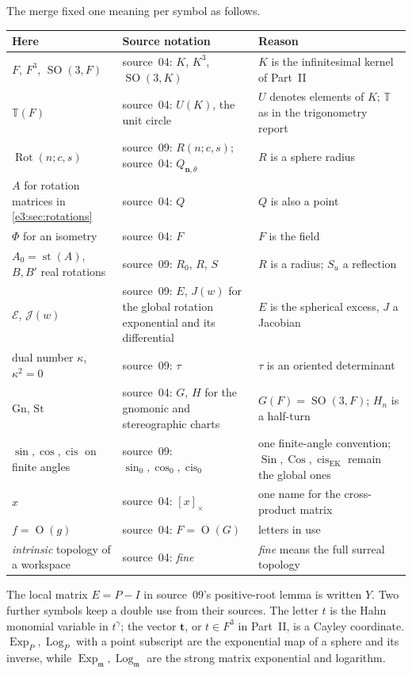 \documentclass[11pt,letterpaper]{article}
\numberwithin{equation}{section}
\theoremstyle{definition}
\theoremstyle{remark}
\newcommand{\TT}{\mathbb T}
\newcommand{\mm}{\mathfrak m}
\newcommand{\st}{\operatorname{st}}
\newcommand{\cis}{\operatorname{cis}}
\newcommand{\SO}{\operatorname{SO}}
\newcommand{\Sin}{\operatorname{Sin}}
\newcommand{\Cos}{\operatorname{Cos}}
\newcommand{\Exp}{\operatorname{Exp}}
\newcommand{\Log}{\operatorname{Log}}
\newcommand{\Rot}{\operatorname{Rot}}
\newcommand{\vv}[1]{\bm{#1}}
\newcommand{\smallO}{\operatorname{O}}
\begin{document}
The merge fixed one meaning per symbol as follows.
\begin{center}\small
\begin{tabular}{L{0.2\textwidth}L{0.34\textwidth}L{0.36\textwidth}}
\toprule
Here & Source notation & Reason\\
\midrule
$F$, $F^3$, $\SO(3,F)$ & source~04: $K$, $K^3$, $\SO(3,K)$ & $K$ is the infinitesimal kernel of Part~II\\
$\TT(F)$ & source~04: $U(K)$, the unit circle & $U$ denotes elements of $K$; $\TT$ as in the trigonometry report\\
$\Rot(n;c,s)$ & source~09: $R(n;c,s)$; source~04: $Q_{\vv n,\theta}$ & $R$ is a sphere radius\\
$A$ for rotation matrices in \cref{e3:sec:rotations} & source~04: $Q$ & $Q$ is also a point\\
$\Phi$ for an isometry & source~04: $F$ & $F$ is the field\\
$A_0=\st(A)$, $B,B'$ real rotations & source~09: $R_0$, $R$, $S$ & $R$ is a radius; $S_u$ a reflection\\
$\mathcal E$, $\mathcal J(w)$ & source~09: $E$, $J(w)$ for the global rotation exponential and its differential & $E$ is the spherical excess, $J$ a Jacobian\\
dual number $\kappa$, $\kappa^2=0$ & source~09: $\tau$ & $\tau$ is an oriented determinant\\
$\mathrm{Gn}$, $\mathrm{St}$ & source~04: $G$, $H$ for the gnomonic and stereographic charts & $G(F)=\SO(3,F)$; $H_n$ is a half-turn\\
$\sin,\cos,\cis$ on finite angles & source~09: $\sin_0,\cos_0,\cis_0$ & one finite-angle convention; $\Sin,\Cos,\cis_{\mathrm{EK}}$ remain the global ones\\
$\widehat x$ & source~04: $[x]_\times$ & one name for the cross-product matrix\\
$f=\smallO(g)$ & source~04: $F=\smallO(G)$ & letters in use\\
\emph{intrinsic} topology of a workspace & source~04: \emph{fine} & \emph{fine} means the full surreal topology\\
\bottomrule
\end{tabular}
\end{center}

The local matrix $E=P-I$ in source~09's positive-root lemma is written $Y$.
Two further symbols keep a double use from their sources. The letter $t$ is the
Hahn monomial variable in $t^\gamma$; the vector $\vv t$, or $t\in F^3$ in
Part~II, is a Cayley coordinate. $\Exp_P,\Log_P$ with a point subscript are the
exponential map of a sphere and its inverse, while $\Exp_{\mm},\Log_{\mm}$ are
the strong matrix exponential and logarithm.
\end{document}
